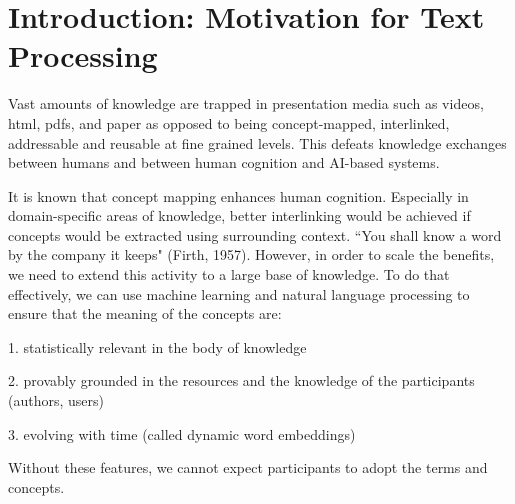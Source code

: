 \section{Introduction: Motivation for Text Processing}

Vast amounts of knowledge are trapped in presentation media such as videos, html, pdfs, and paper as opposed to being concept-mapped, interlinked, addressable and reusable at fine grained levels. This defeats knowledge exchanges between humans and between human cognition and AI-based systems.

It is known that concept mapping enhances human cognition. Especially in domain-specific areas of knowledge, better interlinking would be achieved if concepts would be extracted using surrounding context. ``You shall know a word by the company it keeps" (Firth, 1957). However, in order to scale the benefits, we need to extend this activity to a large base of knowledge. To do that effectively, we can use  machine learning and natural language processing to ensure that the meaning of the concepts are:

1. statistically relevant in the body of knowledge

2. provably grounded in the resources and the knowledge of the participants (authors, users)

3. evolving with time (called dynamic word embeddings)

Without these features, we cannot expect participants to adopt the terms and concepts.

